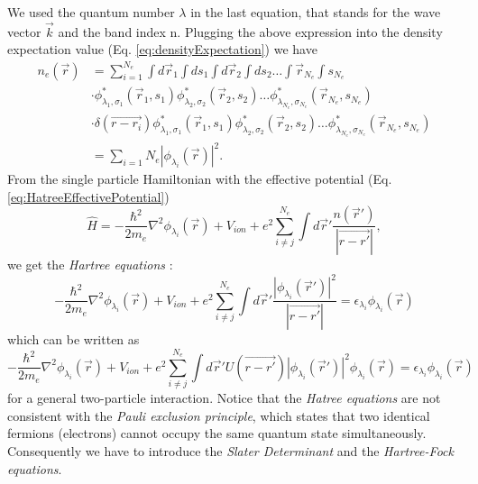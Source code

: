 		We used the quantum number $\lambda$ in the last equation, that stands for the wave vector $\vec k$ and the band index n. Plugging the above expression into the density expectation value (Eq. \ref{eq:densityExpectation})
		we have
		\begin{equation}
			\begin{split}
				n_e(\vec r) &= \sum_{i=1}^{N_e} \int d\vec r_1 \int d s_1 \int d \vec r_2 \int d s_2 \dots \int \vec r_{N_e} \int s_{N_e} \\ & \cdot \phi_{\lambda_1, \sigma_1}^*(\vec r_1, s_1) \phi_{\lambda_2, \sigma_2}^*(\vec r_2, s_2) \dots \phi_{\lambda_{N_e}, \sigma_{N_e}}^*(\vec r_{N_e}, s_{N_e}) \\ & \cdot \delta(\vec{r - r_i}) \phi_{\lambda_1, \sigma_1}^*(\vec r_1, s_1)\phi_{\lambda_2, \sigma_2}^*(\vec r_2, s_2) \dots \phi_{\lambda_{N_e}, \sigma_{N_e}}^*(\vec r_{N_e}, s_{N_e}) \\
				&= \sum_{i=1}{N_e} |\phi_{\lambda_i}(\vec r)|^2.
			\end{split}
		\end{equation}
		From the single particle Hamiltonian with the effective potential (Eq. \ref{eq:HatreeEffectivePotential})
		\begin{equation}
			\hat H = - \frac{\hbar^2}{2 m_e} \nabla^2 \phi_{\lambda_i} (\vec r) + V_{ion} + e^2 \sum_{i \neq j}^{N_e} \int d \vec r' \frac{n(\vec r')}{|\vec{r - r'}|},
		\end{equation}
		we get the \textit{Hartree equations} :
		\begin{equation}
			- \frac{\hbar^2}{2 m_e} \nabla^2 \phi_{\lambda_i} (\vec r) + V_{ion} + e^2 \sum_{i \neq j}^{N_e} \int d \vec r' \frac{|\phi_{\lambda_i}(\vec r')|^2}{|\vec{r - r'}|} = \epsilon_{\lambda_i} \phi_{\lambda_i} (\vec r)
		\end{equation}
		which can be written as 
		\begin{equation}
			- \frac{\hbar^2}{2 m_e} \nabla^2 \phi_{\lambda_i} (\vec r) + V_{ion} + e^2 \sum_{i \neq j}^{N_e} \int d \vec r' U(\vec{r - r'})|\phi_{\lambda_i}(\vec r')|^2 \phi_{\lambda_i}(\vec r) = \epsilon_{\lambda_i} \phi_{\lambda_i} (\vec r)
		\end{equation}
		for a general two-particle interaction. Notice that the \textit{Hatree equations} are not consistent with the \textit{Pauli exclusion principle}, which states that two identical fermions (electrons) cannot occupy the same quantum state simultaneously. Consequently we have to introduce the \textit{Slater Determinant} and the \textit{Hartree-Fock equations}. 
		

